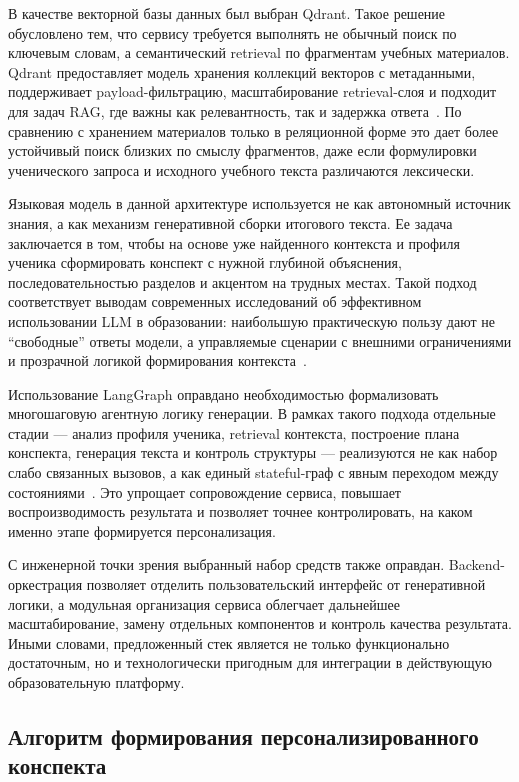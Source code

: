 \documentclass[a4paper,12pt]{extarticle}
\begin{document}
В качестве векторной базы данных был выбран Qdrant. Такое решение обусловлено тем, 
что сервису требуется выполнять не обычный поиск по ключевым словам, 
а семантический retrieval по фрагментам учебных материалов. 
Qdrant предоставляет модель хранения коллекций векторов с метаданными, 
поддерживает payload-фильтрацию, масштабирование retrieval-слоя и подходит для задач RAG, 
где важны как релевантность, так и задержка ответа~\cite{qdrant2026}. 
По сравнению с хранением материалов только в реляционной форме это дает более устойчивый 
поиск близких по смыслу фрагментов, даже если формулировки ученического запроса и 
исходного учебного текста различаются лексически.

Языковая модель в данной архитектуре используется не как автономный источник знания, 
а как механизм генеративной сборки итогового текста. Ее задача заключается в том, 
чтобы на основе уже найденного контекста и профиля ученика сформировать конспект 
с нужной глубиной объяснения, последовательностью разделов и акцентом на трудных местах. 
Такой подход соответствует выводам современных исследований об эффективном использовании 
LLM в образовании: наибольшую практическую пользу дают не ``свободные'' ответы модели, 
а управляемые сценарии с внешними ограничениями и прозрачной логикой формирования 
контекста~\cite{kasneci2023chatgpt,yan2024challenges,shi2025llmedu}.

Использование LangGraph оправдано необходимостью формализовать многошаговую агентную логику
генерации. В рамках такого подхода отдельные стадии --- анализ профиля ученика, retrieval
контекста, построение плана конспекта, генерация текста и контроль структуры --- реализуются
не как набор слабо связанных вызовов, а как единый stateful-граф с явным переходом между
состояниями~\cite{langchain2024}. Это упрощает сопровождение сервиса, повышает
воспроизводимость результата и позволяет точнее контролировать, на каком именно этапе
формируется персонализация.

С инженерной точки зрения выбранный набор средств также оправдан. Backend-оркестрация 
позволяет отделить пользовательский интерфейс от генеративной логики, 
а модульная организация сервиса облегчает дальнейшее масштабирование, 
замену отдельных компонентов и контроль качества результата. 
Иными словами, предложенный стек является не только функционально достаточным, 
но и технологически пригодным для интеграции в действующую образовательную платформу.

\subsection{Алгоритм формирования персонализированного конспекта}
\end{document}
